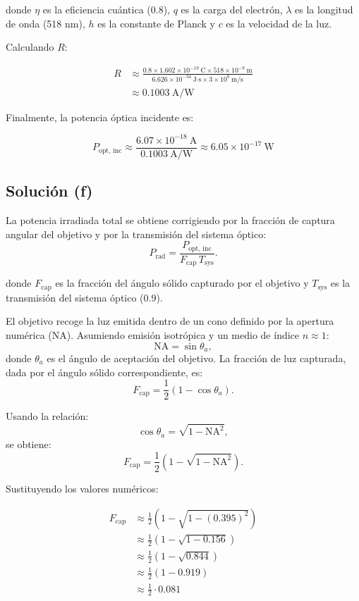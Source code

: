 \documentclass[11pt]{article}
\begin{document}
donde $\eta$ es la eficiencia cuántica (0.8), $q$ es la carga del electrón, $\lambda$ es la longitud de onda (518 nm), $h$ es la constante de Planck y $c$ es la velocidad de la luz.

Calculando $R$:

\begin{align*}
    R &\approx \frac{0.8 \times 1.602 \times 10^{-19}\ \text{C} \times 518 \times 10^{-9}\ \text{m}}{6.626 \times 10^{-34}\ \text{J·s} \times 3 \times 10^{8}\ \text{m/s}} \\
    &\approx 0.1003\ \text{A/W}
\end{align*}

Finalmente, la potencia óptica incidente es:

\begin{equation*}
    P_{\text{opt, inc}} \approx \frac{6.07 \times 10^{-18}\ \text{A}}{0.1003\ \text{A/W}} \approx 6.05 \times 10^{-17}\ \text{W}
\end{equation*}

\subsection*{Solución (f)}

La potencia irradiada total se obtiene corrigiendo por la fracción de captura angular del objetivo y por la transmisión del sistema óptico:
\[
P_{\text{rad}} = 
\frac{P_{\text{opt, inc}}}{F_{\text{cap}} \, T_{\text{sys}}}.
\]

donde $F_{\text{cap}}$ es la fracción del ángulo sólido capturado por el objetivo y $T_{\text{sys}}$ es la transmisión del sistema óptico (0.9).

El objetivo recoge la luz emitida dentro de un cono definido por la apertura numérica (NA).  
Asumiendo emisión isotrópica y un medio de índice $n \approx 1$:
\[
\text{NA} = \sin\theta_a,
\]
donde $\theta_a$ es el ángulo de aceptación del objetivo.  
La fracción de luz capturada, dada por el ángulo sólido correspondiente, es:
\[
F_{\text{cap}} = \frac{1}{2}\left(1 - \cos\theta_a\right).
\]

Usando la relación:
\[
\cos\theta_a = \sqrt{1 - \text{NA}^2},
\]
se obtiene:
\[
F_{\text{cap}} = \frac{1}{2}\left(1 - \sqrt{1 - \text{NA}^2}\right).
\]

Sustituyendo los valores numéricos:

\begin{align*}
F_{\text{cap}} &\approx \frac{1}{2}\left(1 - \sqrt{1 - (0.395)^2}\right) \\
&\approx \frac{1}{2}\left(1 - \sqrt{1 - 0.156}\right) \\
&\approx \frac{1}{2}\left(1 - \sqrt{0.844}\right) \\
&\approx \frac{1}{2}\left(1 - 0.919\right) \\
&\approx \frac{1}{2} \cdot 0.081
\end{align*}
\end{document}
